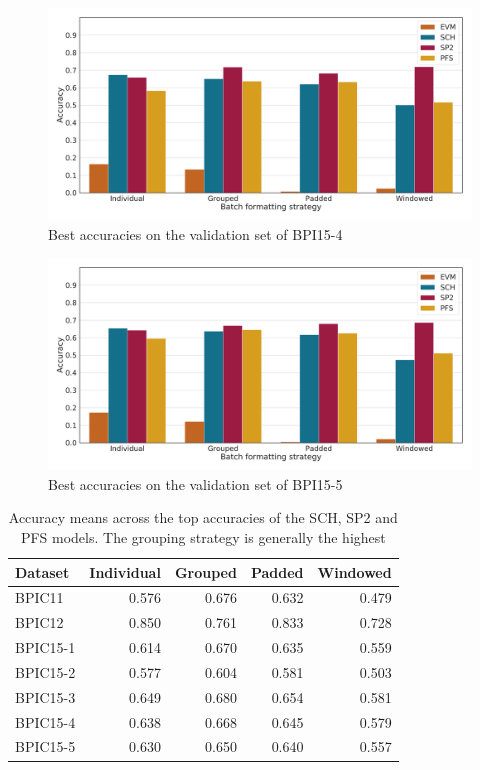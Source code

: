 \begin{figure}
    \centering
    \includegraphics[width=\textwidth]{gfx/bpic2015_4/accuracies.pdf}
    \caption{Best accuracies on the validation set of BPI15-4}
    \label{fig:max-accuracies-bpic2015-4}
\end{figure}
\begin{figure}
    \centering
    \includegraphics[width=\textwidth]{gfx/bpic2015_5/accuracies.pdf}
    \caption{Best accuracies on the validation set of BPI15-5}
    \label{fig:max-accuracies-bpic2015-5}
\end{figure}
\begin{table}
\centering
\begin{tabular}{l|rrrr}
Dataset  &  Individual &   Grouped &    Padded &  Windowed \\
\midrule
BPIC11   &    0.576    &  0.676    &  0.632    &  0.479    \\
BPIC12   &    0.850    &  0.761    &  0.833    &  0.728    \\
BPIC15-1 &    0.614    &  0.670    &  0.635    &  0.559    \\
BPIC15-2 &    0.577    &  0.604    &  0.581    &  0.503    \\
BPIC15-3 &    0.649    &  0.680    &  0.654    &  0.581    \\
BPIC15-4 &    0.638    &  0.668    &  0.645    &  0.579    \\
BPIC15-5 &    0.630    &  0.650    &  0.640    &  0.557    \\
\end{tabular}
\caption[Grouping strategy leads to best mean accuracies]{Accuracy means across the top accuracies of the SCH, SP2 and PFS models. The grouping strategy is generally the highest}
\label{tab:strategy-top-accuracies}
\end{table}
\FloatBarrier

